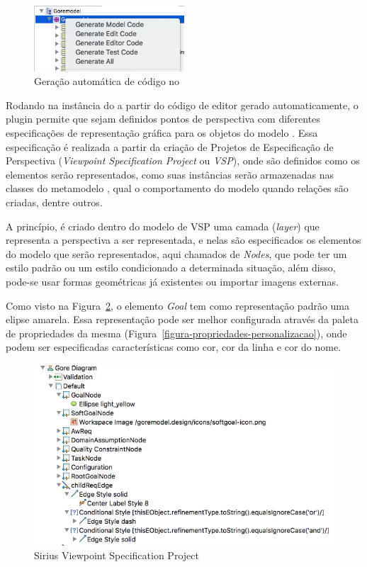 \begin{figure}[h]
	\centering
	\includegraphics[width=0.5\textwidth]{figuras/unagi/exemplo-gera-codigo.png}
	\caption{Geração automática de código no \eclipse}
	\label{figura-gera-codigo}
\end{figure}

Rodando na instância do \eclipse a partir do código de editor gerado automaticamente, o plugin \sirius permite que sejam definidos pontos de perspectiva com diferentes especificações de representação gráfica para os objetos do modelo \ecore. Essa especificação é realizada a partir da criação de Projetos de Especificação de Perspectiva (\textit{Viewpoint Specification Project} ou \textit{VSP}), onde são definidos como os elementos serão representados, como suas instâncias serão armazenadas nas classes do metamodelo \ecore, qual o comportamento do modelo quando relações são criadas, dentre outros.

A princípio, é criado dentro do modelo de VSP uma camada (\textit{layer}) que representa a perspectiva a ser representada, e nelas são especificados os elementos do modelo \ecore que serão representados, aqui chamados de \textit{Nodes}, que pode ter um estilo padrão ou um estilo condicionado a determinada situação, além disso, pode-se usar formas geométricas já existentes ou importar imagens externas. 

Como visto na Figura~\ref{exemplo-sirius-vsp}, o elemento \textit{Goal} tem como representação padrão uma elipse amarela. Essa representação pode ser melhor configurada através da paleta de propriedades da mesma (Figura~\ref{figura-propriedades-personalizacao}), onde podem ser especificadas características como cor, cor da linha e cor do nome.

\begin{figure}[h]
	\centering
	\includegraphics[width=1\textwidth]{figuras/unagi/exemplo-sirius-vsp.png}
	\caption{Sirius Viewpoint Specification Project}
	\label{exemplo-sirius-vsp}
\end{figure}

